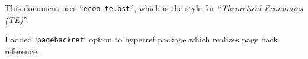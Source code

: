 \documentclass[10pt]{article}
\begin{document}
This document uses ``\verb|econ-te.bst|'', which is the style for
``\href{https://econtheory.org/}{\textit{Theoretical Economics (TE)}}''.

\vspace{1em}

I added `\texttt{pagebackref}` option to hyperref package which realizes page
back reference.

\vspace{1em}


\nocite{*}



\end{document}
